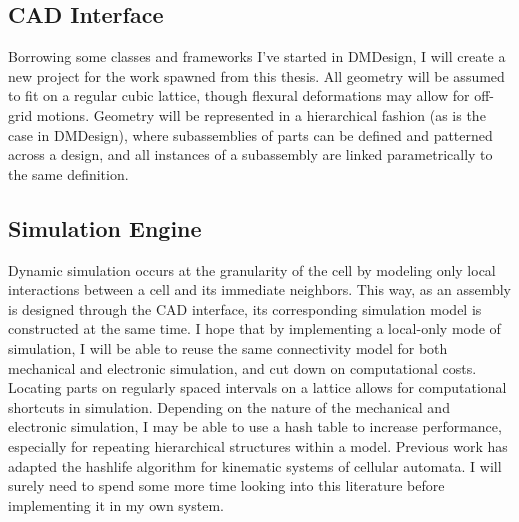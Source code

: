 {\subsection{CAD Interface}


Borrowing some classes and frameworks I've started in DMDesign, I will create a new project for the work spawned from this thesis.  All geometry will be assumed to fit on a regular cubic lattice, though flexural deformations may allow for off-grid motions.  Geometry will be represented in a hierarchical fashion (as is the case in DMDesign), where subassemblies of parts can be defined and patterned across a design, and all instances of a subassembly are linked parametrically to the same definition.



\subsection{Simulation Engine}

Dynamic simulation occurs at the granularity of the cell by modeling only local interactions between a cell and its immediate neighbors.  This way, as an assembly is designed through the CAD interface, its corresponding simulation model is constructed at the same time.  I hope that by implementing a local-only mode of simulation, I will be able to reuse the same connectivity model for both mechanical and electronic simulation, and cut down on computational costs.
\\

Locating parts on regularly spaced intervals on a lattice allows for computational shortcuts in simulation.  Depending on the nature of the mechanical and electronic simulation, I may be able to use a hash table to increase performance\cite{Gosper1984}, especially for repeating hierarchical structures within a model.  Previous work has adapted the hashlife algorithm for kinematic systems of cellular automata\cite{Stevens2010}.  I will surely need to spend some more time looking into this literature before implementing it in my own system.
\\

}
